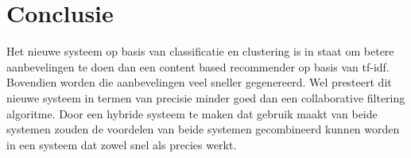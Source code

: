 \section{Conclusie}
Het nieuwe systeem op basis van classificatie en clustering is in staat om betere aanbevelingen te doen dan een content based recommender op basis van tf-idf. Bovendien worden die aanbevelingen veel sneller gegenereerd. Wel presteert dit nieuwe systeem in termen van precisie minder goed dan een collaborative filtering algoritme. Door een hybride systeem te maken dat gebruik maakt van beide systemen zouden de voordelen van beide systemen gecombineerd kunnen worden in een systeem dat zowel snel als precies werkt.
